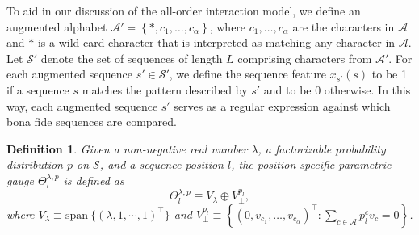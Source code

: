 \documentclass{article}
\numberwithin{myclaim}{section}
\newcommand{\set}[1]{\left\{ #1 \right\}}
\newtheorem{definition}{Definition}
\begin{document}
To aid in our discussion of the all-order interaction model, we define an augmented alphabet $\mathcal{A}' = \set{*, c_1, \ldots, c_\alpha}$, where $c_1, \ldots, c_\alpha$ are the characters in $\mathcal{A}$ and $*$ is a wild-card character that is interpreted as matching any character in $\mathcal{A}$. Let $\mathcal{S}'$ denote the set of sequences of length $L$ comprising characters from  $\mathcal{A}'$. For each augmented sequence $s' \in \mathcal{S}'$, we define the sequence feature $x_{s'}(s)$ to be 1 if a sequence $s$ matches the pattern described by $s'$ and to be 0 otherwise. In this way, each augmented sequence $s'$ serves as a regular expression against which bona fide sequences are compared.  

\begin{definition}
Given a non-negative real number $\lambda$, a factorizable probability distribution $p$ on $\mathcal{S}$, and a sequence position $l$, the position-specific parametric gauge $\Theta_l^{\lambda,p}$ is defined as
\begin{equation}
    \Theta_l^{\lambda,p} \equiv V_\lambda \oplus V_\perp^{p_l},
\end{equation}    
where $V_\lambda \equiv \mathrm{span}\ \{(\lambda, 1, \cdots, 1)^\top\}$ and $V_\perp^{p_l} \equiv \set{(0, v_{c_1}, \ldots, v_{c_\alpha})^\top: \sum_{c \in \mathcal{A}} p_l^{c} v_c = 0}$.
\end{definition}
\end{document}
